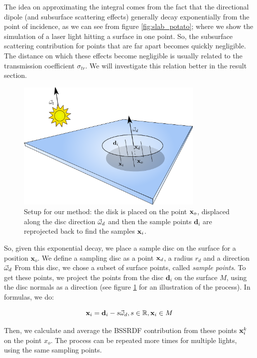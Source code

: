 The idea on approximating the integral comes from the fact that the directional dipole (and subsurface scattering effects) generally decay exponentially from the point of incidence, as we can see from figure \ref{fig:slab_potato}; where we show the simulation of a laser light hitting a surface in one point. So, the subsurface scattering contribution for points that are far apart becomes quickly negligible. The distance on which these effects become negligible is usually related to the transmission coefficient $\sigma_{tr}$. We will investigate this relation better in the result section. 

\begin{figure}
\centering
\includegraphics[width=0.8\textwidth]{images/disk_setup.pdf}
\caption{Setup for our method: the disk is placed on the point $\mathbf{x}_o$, displaced along the disc direction $\vec{\omega}_d$ and then the sample points $\mathbf{d}_i$ are reprojected back to find the samples $\mathbf{x}_i$.}
\label{fig:disksetup}
\end{figure}
\FloatBarrier

So, given this exponential decay, we place a sample disc on the surface for a position $\mathbf{x}_o$. We define a sampling disc as a point $\mathbf{x}_d$, a radius $r_d$ and a direction $\vec{\omega}_d$ From this disc, we chose a subset of surface points, called \emph{sample points}. To get these points, we project the points from the disc $\mathbf{d}_i$ on the surface $M$, using the disc normals as a direction (see figure \ref{fig:disksetup} for an illustration of the process). In formulas, we do:

\begin{equation*}
\mathbf{x}_i = \mathbf{d}_i - s \vec{\omega}_d, s \in \mathbb{R}, \mathbf{x}_i \in M
\end{equation*}

Then, we calculate and average the BSSRDF contribution from these points $\mathbf{x}_i^k$ on the point $x_o$. The process can be repeated more times for multiple lights, using the same sampling points. 

